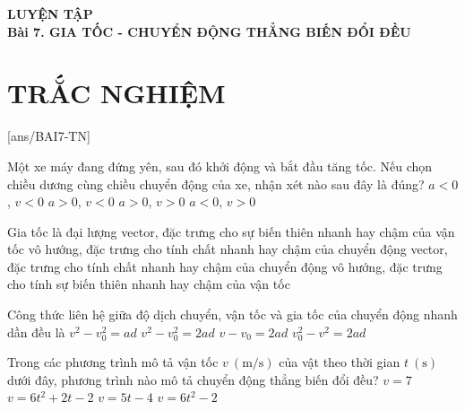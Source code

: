 \begin{center}\textbf{\color{red}LUYỆN TẬP}\\
	\textbf{Bài 7. GIA TỐC - CHUYỂN ĐỘNG THẲNG BIẾN ĐỔI ĐỀU}
\end{center}
\section{TRẮC NGHIỆM}
[ans/BAI7-TN]
\begin{ex}
	Một xe máy đang đứng yên, sau đó khởi động và bắt đầu tăng tốc. Nếu chọn chiều dương cùng  chiều chuyển động của xe, nhận xét nào sau đây là đúng? 
	\choice
	{$a<0$, $v<0$}
	{$a>0$, $v<0$}
	{\True $a>0$, $v>0$}
	{$a<0$, $v>0$}
	\loigiai{}
\end{ex}
\begin{ex}
	Gia tốc là đại lượng
	\choice
	{\True vector, đặc trưng cho sự biến thiên nhanh hay chậm của vận tốc}
	{vô hướng, đặc trưng cho tính chất nhanh hay chậm của chuyển động}
	{vector, đặc trưng cho tính chất nhanh hay chậm của chuyển động}
	{vô hướng, đặc trưng cho tính sự biến thiên nhanh hay chậm của vận tốc}
	\loigiai{}
\end{ex}
\begin{ex}
	Công thức liên hệ giữa độ dịch chuyển, vận tốc và gia tốc của chuyển động nhanh dần đều là
	\choice
	{$v^2-v^2_0=ad$}
	{\True $v^2-v^2_0=2ad$}
	{$v-v_0=2ad$}
	{$v^2_0-v^2=2ad$}
	\loigiai{}
\end{ex}
\begin{ex}
	Trong các phương trình mô tả vận tốc $v\ \left(\si{\meter/\second}\right)$ của vật theo thời gian $t\ \left(\si{\second}\right)$ dưới đây, phương trình nào mô tả chuyển động thẳng biến đổi đều?
	\choice
	{$v=7$}
	{$v=6t^2+2t-2$}
	{\True $v=5t-4$}
	{$v=6t^2-2$}
	\loigiai{}
\end{ex}
